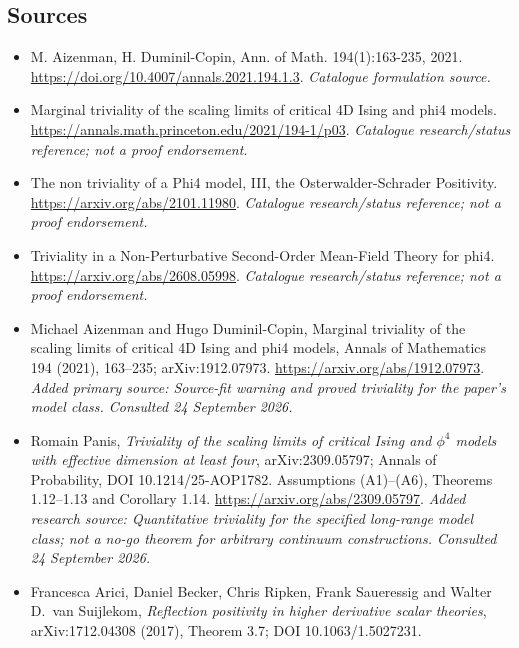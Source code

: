 \documentclass[11pt]{article}
\begin{document}
\subsection{Sources}
\begin{itemize}\raggedright
\item[\textnormal{[S1]}]\hypertarget{source:51:1}{} M. Aizenman, H. Duminil-Copin, Ann. of Math. 194(1):163-235, 2021.
\url{https://doi.org/10.4007/annals.2021.194.1.3}.
{\small\textit{Catalogue formulation source.}}
\item[\textnormal{[S2]}]\hypertarget{source:51:2}{} Marginal triviality of the scaling limits of critical 4D Ising and phi4 models.
\url{https://annals.math.princeton.edu/2021/194-1/p03}.
{\small\textit{Catalogue research/status reference; not a proof endorsement.}}
\item[\textnormal{[S3]}]\hypertarget{source:51:3}{} The non triviality of a Phi4 model, III, the Osterwalder-Schrader Positivity.
\url{https://arxiv.org/abs/2101.11980}.
{\small\textit{Catalogue research/status reference; not a proof endorsement.}}
\item[\textnormal{[S4]}]\hypertarget{source:51:4}{} Triviality in a Non-Perturbative Second-Order Mean-Field Theory for phi4.
\url{https://arxiv.org/abs/2608.05998}.
{\small\textit{Catalogue research/status reference; not a proof endorsement.}}
\item[\textnormal{[E1]}]\hypertarget{extra:51:1}{} Michael Aizenman and Hugo Duminil-Copin, Marginal triviality of the scaling limits of critical 4D Ising and phi4 models, Annals of Mathematics 194 (2021), 163--235; arXiv:1912.07973.
\url{https://arxiv.org/abs/1912.07973}.
{\small\textit{Added primary source: Source-fit warning and proved triviality for the paper's model class. Consulted 24 September 2026.}}
\item[\textnormal{[E2]}]\hypertarget{extra:51:2}{} Romain Panis, \emph{Triviality of the scaling limits of critical Ising and $\phi^4$ models with effective dimension at least four}, arXiv:2309.05797; Annals of Probability, DOI 10.1214/25-AOP1782. Assumptions (A1)--(A6), Theorems 1.12--1.13 and Corollary 1.14.
\url{https://arxiv.org/abs/2309.05797}.
{\small\textit{Added research source: Quantitative triviality for the specified long-range model class; not a no-go theorem for arbitrary continuum constructions. Consulted 24 September 2026.}}
\item[\textnormal{[E3]}]\hypertarget{extra:51:3}{} Francesca Arici, Daniel Becker, Chris Ripken, Frank Saueressig and Walter D.\ van Suijlekom, \emph{Reflection positivity in higher derivative scalar theories}, arXiv:1712.04308 (2017), Theorem 3.7; DOI 10.1063/1.5027231.

\end{itemize}
\end{document}
